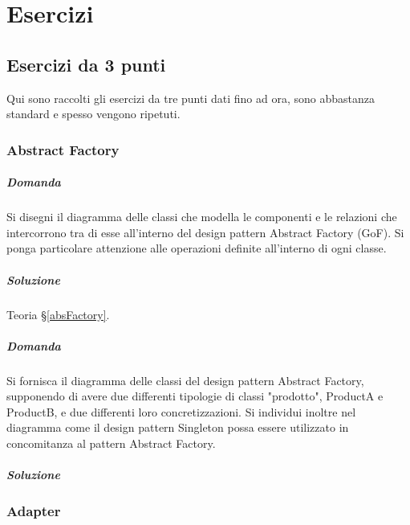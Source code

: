 \chapter{Esercizi}

\section{Esercizi da 3 punti}
Qui sono raccolti gli esercizi da tre punti dati fino ad ora, sono abbastanza standard e spesso vengono ripetuti.

\subsection{Abstract Factory}

\paragraph{Domanda}

Si disegni il diagramma delle classi che modella le componenti e le relazioni che intercorrono tra di esse all'interno del design pattern Abstract Factory (GoF). Si ponga particolare attenzione alle operazioni definite all'interno di ogni classe.

\paragraph{Soluzione} Teoria §\ref{absFactory}.

\paragraph{Domanda}

Si fornisca il diagramma delle classi del design pattern Abstract Factory, supponendo di avere due differenti tipologie di classi "prodotto", ProductA e ProductB, e due differenti loro concretizzazioni. Si individui inoltre nel diagramma come il design pattern Singleton possa essere utilizzato in concomitanza al pattern Abstract Factory.

\paragraph{Soluzione}


\subsection{Adapter}

